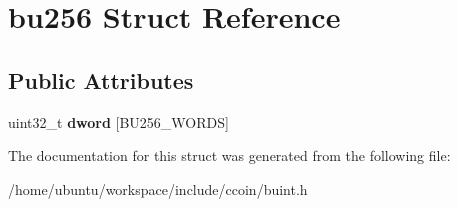 \hypertarget{structbu256}{\section{bu256 Struct Reference}
\label{structbu256}
}
\subsection*{Public Attributes}
\begin{DoxyCompactItemize}
\item 
\hypertarget{structbu256_a0f4db5ad2956a9083bee133a6d4fbb78}{uint32\-\_\-t {\bfseries dword} \mbox{[}B\-U256\-\_\-\-W\-O\-R\-D\-S\mbox{]}}\label{structbu256_a0f4db5ad2956a9083bee133a6d4fbb78}

\end{DoxyCompactItemize}


The documentation for this struct was generated from the following file\-:\begin{DoxyCompactItemize}
\item 
/home/ubuntu/workspace/include/ccoin/buint.\-h\end{DoxyCompactItemize}
